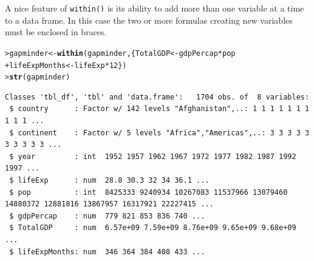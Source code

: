 \documentclass[12pt,oneside]{book}\usepackage[]{graphicx}\usepackage[]{color}
\makeatletter
\newcommand{\hlnum}[1]{\textcolor[rgb]{0.686,0.059,0.569}{#1}}%
\newcommand{\hlopt}[1]{\textcolor[rgb]{0,0,0}{#1}}%
\newcommand{\hlstd}[1]{\textcolor[rgb]{0.345,0.345,0.345}{#1}}%
\newcommand{\hlkwb}[1]{\textcolor[rgb]{0.69,0.353,0.396}{#1}}%
\newcommand{\hlkwd}[1]{\textcolor[rgb]{0.737,0.353,0.396}{\textbf{#1}}}%
\newenvironment{kframe}{%
 \def\at@end@of@kframe{}%
 \ifinner\ifhmode%
  \def\at@end@of@kframe{\end{minipage}}%
  \begin{minipage}{\columnwidth}%
 \fi\fi%
 \def\FrameCommand##1{\hskip\@totalleftmargin \hskip-\fboxsep
 \colorbox{shadecolor}{##1}\hskip-\fboxsep
     \hskip-\linewidth \hskip-\@totalleftmargin \hskip\columnwidth}%
 \MakeFramed {\advance\hsize-\width
   \@totalleftmargin\z@ \linewidth\hsize
   \@setminipage}}%
 {\par\unskip\endMakeFramed%
 \at@end@of@kframe}
\newenvironment{knitrout}{}{} %
\makeatother
\begin{document}
A nice feature of \verb+within()+ is its ability to add more than one variable at a time to a data frame. In this case the two or more formulas creating new variables must be enclosed in braces.
\begin{knitrout}
\color{fgcolor}\begin{kframe}
\begin{alltt}
\hlstd{> }\hlstd{gapminder} \hlkwb{<-} \hlkwd{within}\hlstd{(gapminder, \{TotalGDP} \hlkwb{<-} \hlstd{gdpPercap} \hlopt{*} \hlstd{pop}
\hlstd{+ }    \hlstd{lifeExpMonths} \hlkwb{<-} \hlstd{lifeExp} \hlopt{*} \hlnum{12}\hlstd{\})}
\hlstd{> }\hlkwd{str}\hlstd{(gapminder)}
\end{alltt}
\begin{verbatim}
Classes 'tbl_df', 'tbl' and 'data.frame':	1704 obs. of  8 variables:
 $ country      : Factor w/ 142 levels "Afghanistan",..: 1 1 1 1 1 1 1 1 1 1 ...
 $ continent    : Factor w/ 5 levels "Africa","Americas",..: 3 3 3 3 3 3 3 3 3 3 ...
 $ year         : int  1952 1957 1962 1967 1972 1977 1982 1987 1992 1997 ...
 $ lifeExp      : num  28.8 30.3 32 34 36.1 ...
 $ pop          : int  8425333 9240934 10267083 11537966 13079460 14880372 12881816 13867957 16317921 22227415 ...
 $ gdpPercap    : num  779 821 853 836 740 ...
 $ TotalGDP     : num  6.57e+09 7.59e+09 8.76e+09 9.65e+09 9.68e+09 ...
 $ lifeExpMonths: num  346 364 384 408 433 ...
\end{verbatim}
\end{kframe}
\end{knitrout}
\end{document}
